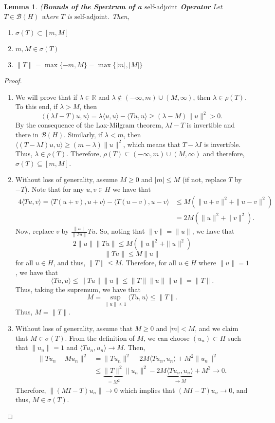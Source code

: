 \documentclass[12pt]{article}
\newtheorem{lemma}{Lemma}
\newcommand{\R}{{\mathbb R}}
\newcommand{\B}{\mathscr{B}}
\newcommand{\la}{\langle}
\newcommand{\ra}{\rangle}
\newcommand{\sbs}{\subset}
\newcommand{\sse}{\subseteq}
\newcommand{\saj}{\text{self-adjoint}}
\begin{document}
\begin{lemma} (\textbf{Bounds of the Spectrum of a $\saj$ Operator}
Let $T \in \B(H)$ where $T$ is $\saj$. Then,
\begin{enumerate}[topsep=-15pt, itemsep=0pt]
\item[(i)] $\sigma(T) \sbs [m, M]$
\item[(ii)] $m, M \in \sigma(T)$
\item[(iii)] $\| T \| = \max\{ -m, M \} = \max\{ |m|, |M| \}$
\end{enumerate}
\end{lemma}
\begin{proof}
\begin{enumerate}
\item[(i)] We will prove that if $\lambda \in \R$ and $\lambda \not\in (-\infty, m) \cup (M, \infty)$, then $\lambda \in \rho(T)$. To this end, if $\lambda > M$, then
\[ \la (\lambda I - T) u, u\ra = \lambda \la u, u \ra - \la Tu, u \ra \geq (\lambda - M) \| u \|^2 > 0. \]
By the consequence of the Lax-Milgram theorem, $\lambda I - T$ is invertible and there in $\B(H)$. Similarly, if $\lambda < m$, then $\la (T - \lambda I) u, u \ra \geq (m - \lambda) \| u \|^2$, which means that $T - \lambda I$ is invertible. Thus, $\lambda \in \rho(T)$. Therefore, $\rho(T) \sse (-\infty, m) \cup (M,\infty)$ and therefore, $\sigma(T) \sse [m, M]$. 
\item[(iii)] Without loss of generality, assume $M \geq 0$ and $|m |\leq M$ (if not, replace $T$ by $-T$). Note that for any $u, v \in H$ we have that 
\begin{align*}
4 \la Tu, v \ra = \la T(u + v), u + v \ra - \la T(u - v), u -v \ra & \leq M \left( \| u + v \|^2 + \| u - v \|^2 \right) \\
& = 2 M \left( \| u \|^2 + \| v \|^2 \right).
\end{align*}
Now, replace $v$ by $\frac{\| u \|}{\| Tu \|} Tu$. So, noting that $\| v \| = \| u \|$, we have that 
\[ 2 \| u \| \| T u \| \leq M \left( \| u \|^2  + \| u \|^2 \right)\]
\[ \| T u \| \leq M \| u \|\]
for all $u \in H$, and thus, $ \| T \| \leq M$. Therefore, for all $u \in H$ where $ \| u \| = 1$, we have that 
\[ \la Tu, u \ra \leq \| T u \| \| u \| \leq \| T \| \| u \| \| u \| = \| T \|.\]
Thus, taking the supremum, we have that 
\[ M = \sup\limits_{\| u \| \leq 1} \la Tu, u \ra \leq \| T \|.\]
Thus, $M = \| T \|$. 
\item[(ii)] Without loss of generality, assume that $M \geq 0$ and $|m |< M$, and we claim that $M \in \sigma(T)$. From the definition of $M$, we can choose $(u_n) \sbs H$ such that $\|u_n \| = 1$ and $\la  T u_n , u_n \ra \to M$. Then, 
\begin{align*}
\| Tu_n - M u_n \|^2 &= \| Tu_n \|^2 - 2M \la Tu_n , u_n \ra + M^2 \| u_n \|^2 \\
& \leq \underbrace{\| T \|^2}_{= M^2} \| u_n \|^2 - 2M \underbrace{\la Tu_n, u_n\ra}_{\to M} + M^2 \to 0. 
\end{align*}
Therefore, $\| (MI - T)u_n \| \to 0$ which implies that $(MI - T)u_n \to 0$, and thus, $M \in \sigma(T)$. 
\end{enumerate}
\end{proof}
\end{document}
